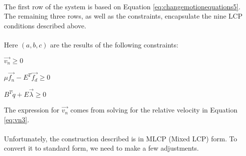 {\begin{equation}
\begin{array}{cc}
\begin{matrix}
\end{matrix}
\end{array}
\end{equation}
The first row of the system is based on Equation \ref{eq:changemotionequations5}. The remaining three rows, as well as the constraints, encapsulate the nine LCP conditions described above.
\\
\\
Here $(a, b, c)$ are the results of the following constraints: 
\begin{packed_item}
\item $\vec{v_n} \geq 0$
\item $\mu\vec{f_n} - E^T\vec{f_d} \geq 0$
\item $B^T\dot{q} + E\vec{\lambda} \geq 0$
\end{packed_item}
The expression for $\vec{v_n}$ comes from solving for the relative velocity in Equation \ref{eq:vn3}.
\\
\\
Unfortunately, the construction described is in MLCP (Mixed LCP)
form. To convert it to standard form, we need to make a few
adjustments.
}